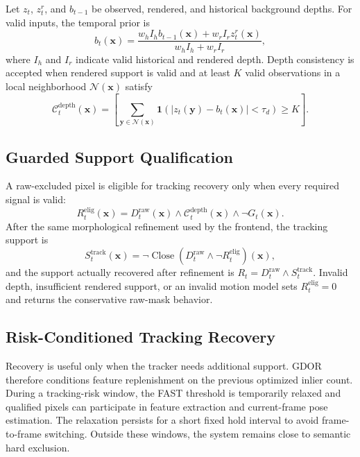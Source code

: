 Let $z_t$, $z_t^r$, and $b_{t-1}$ be observed, rendered, and historical background depths.
For valid inputs, the temporal prior is
\begin{equation}
b_t(\mathbf{x})=
\frac{w_h I_h b_{t-1}(\mathbf{x})+w_r I_r z_t^r(\mathbf{x})}
{w_h I_h+w_r I_r},
\label{eq:background-depth}
\end{equation}
where $I_h$ and $I_r$ indicate valid historical and rendered depth.
Depth consistency is accepted when rendered support is valid and at least $K$ valid observations in a local neighborhood $\mathcal N(\mathbf{x})$ satisfy
\begin{equation}
\mathcal C_t^{\mathrm{depth}}(\mathbf{x})=
\left[
\sum_{\mathbf{y}\in\mathcal N(\mathbf{x})}
\mathbf{1}\!\left(|z_t(\mathbf{y})-b_t(\mathbf{x})|<\tau_d\right)
\ge K
\right].
\label{eq:depth-consistency}
\end{equation}

\subsection{Guarded Support Qualification}

A raw-excluded pixel is eligible for tracking recovery only when every required signal is valid:
\begin{equation}
R_t^{\mathrm{elig}}(\mathbf{x}) =
D_t^{\mathrm{raw}}(\mathbf{x})
\land \mathcal{C}_t^{\mathrm{depth}}(\mathbf{x})
\land \neg G_t(\mathbf{x}).
\label{eq:recovery}
\end{equation}
After the same morphological refinement used by the frontend, the tracking support is
\begin{equation}
S_t^{\mathrm{track}}(\mathbf{x}) =
\neg\operatorname{Close}\!\left(
D_t^{\mathrm{raw}}\land\neg R_t^{\mathrm{elig}}
\right)(\mathbf{x}),
\label{eq:tracking-support}
\end{equation}
and the support actually recovered after refinement is
$R_t=D_t^{\mathrm{raw}}\land S_t^{\mathrm{track}}$.
Invalid depth, insufficient rendered support, or an invalid motion model sets $R_t^{\mathrm{elig}}=0$ and returns the conservative raw-mask behavior.

\subsection{Risk-Conditioned Tracking Recovery}

Recovery is useful only when the tracker needs additional support.
GDOR therefore conditions feature replenishment on the previous optimized inlier count.
During a tracking-risk window, the FAST threshold is temporarily relaxed and qualified pixels can participate in feature extraction and current-frame pose estimation.
The relaxation persists for a short fixed hold interval to avoid frame-to-frame switching.
Outside these windows, the system remains close to semantic hard exclusion.


